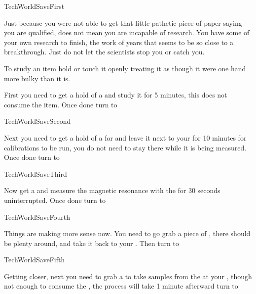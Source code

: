 \documentclass[greennotebook]{guildcamp3} %
\begin{document}
\startnotebook{\nTechWorldSave{}}

\begin{page}{TechWorldSaveFirst}
	
Just because you were not able to get that little pathetic piece of paper saying you are qualified, does not mean you are incapable of research. You have some of your own research to finish, the work of years that seems to be so close to a breakthrough. Just do not let the scientists stop you or catch you.  

To study an item hold or touch it openly treating it as though it were one hand more bulky than it is. 

First you need to get a hold of a \iCircuitBoard{} and study it for 5 minutes, this does not consume the item. Once done turn to 
	
\end{page}

\begin{page}{TechWorldSaveSecond}
	
Next you need to get a hold of a \iMagnet{} for and leave it next to your \sTechWorkbench{} for 10 minutes for calibrations to be run, you do not need to stay there while it is being measured. Once done turn to 

	
\end{page}

\begin{page}{TechWorldSaveThird}
	
Now get a \iLeadPipe{} and measure the magnetic resonance with the \iMagnet{} for 30 seconds uninterrupted. Once done turn to 
	
\end{page}

\begin{page}{TechWorldSaveFourth}
	
	Things are making more sense now. You need to go grab a piece of \iScrapMetal{}, there should be plenty around, and take it back to your \sTechWorkbench{}. Then turn to 
	
\end{page}

\begin{page}{TechWorldSaveFifth}
	
	Getting closer, next you need to grab a \iMonoBlade{} to take samples from the \iScrapMetal{} at your \sTechWorkbench{}, though not enough to consume the \iScrapMetal{}, the process will take 1 minute  afterward turn to  
	
\end{page}
\end{document}
